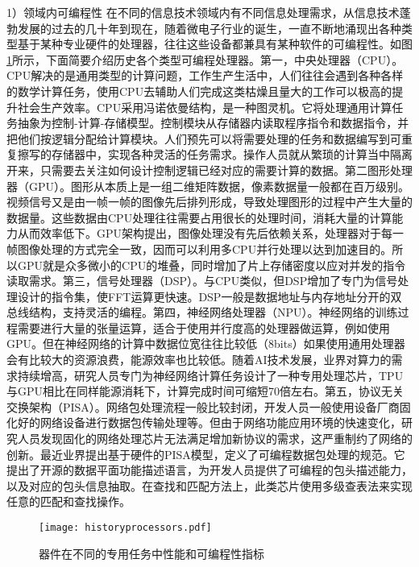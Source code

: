 
1）领域内可编程性
在不同的信息技术领域内有不同信息处理需求，从信息技术蓬勃发展的过去的几十年到现在，随着微电子行业的诞生，一直不断地涌现出各种类型基于某种专业硬件的处理器，往往这些设备都兼具有某种软件的可编程性。如图\ref{historyprocessors}所示，下面简要介绍历史各个类型可编程处理器。第一，中央处理器（CPU）。CPU解决的是通用类型的计算问题，工作生产生活中，人们往往会遇到各种各样的数学计算任务，使用CPU去辅助人们完成这类枯燥且量大的工作可以极高的提升社会生产效率。CPU采用冯诺依曼结构，是一种图灵机。它将处理通用计算任务抽象为控制-计算-存储模型。控制模块从存储器内读取程序指令和数据指令，并把他们按逻辑分配给计算模块。人们预先可以将需要处理的任务和数据编写到可重复擦写的存储器中，实现各种灵活的任务需求。操作人员就从繁琐的计算当中隔离开来，只需要去关注如何设计控制逻辑已经对应的需要计算的数据。第二图形处理器（GPU）。图形从本质上是一组二维矩阵数据，像素数据量一般都在百万级别。视频信号又是由一帧一帧的图像先后排列形成，导致处理图形的过程中产生大量的数据量。这些数据由CPU处理往往需要占用很长的处理时间，消耗大量的计算能力从而效率低下。GPU架构提出，图像处理没有先后依赖关系，处理器对于每一帧图像处理的方式完全一致，因而可以利用多CPU并行处理以达到加速目的。所以GPU就是众多微小的CPU的堆叠，同时增加了片上存储密度以应对并发的指令读取需求。第三，信号处理器（DSP）。与CPU类似，但DSP增加了专门为信号处理设计的指令集，使FFT运算更快速。DSP一般是数据地址与内存地址分开的双总线结构，支持灵活的编程。第四，神经网络处理器（NPU）。神经网络的训练过程需要进行大量的张量运算，适合于使用并行度高的处理器做运算，例如使用GPU。但在神经网络的计算中数据位宽往往比较低（8bits）如果使用通用处理器会有比较大的资源浪费，能源效率也比较低。随着AI技术发展，业界对算力的需求持续增高，研究人员专门为神经网络计算任务设计了一种专用处理芯片，TPU与GPU相比在同样能源消耗下，计算完成时间可缩短70倍左右。第五，协议无关交换架构（PISA）。网络包处理流程一般比较封闭，开发人员一般使用设备厂商固化好的网络设备进行数据包传输处理等。但由于网络功能应用环境的快速变化，研究人员发现固化的网络处理芯片无法满足增加新协议的需求，这严重制约了网络的创新。最近业界提出基于硬件的PISA模型，定义了可编程数据包处理的规范。它提出了开源的数据平面功能描述语言，为开发人员提供了可编程的包头描述能力，以及对应的包头信息抽取。在查找和匹配方法上，此类芯片使用多级查表法来实现任意的匹配和查找操作。

\begin{figure}[!ht]
	\centering
	\texttt{[image: historyprocessors.pdf]}
	\caption{器件在不同的专用任务中性能和可编程性指标} \label{historyprocessors}
\end{figure}


